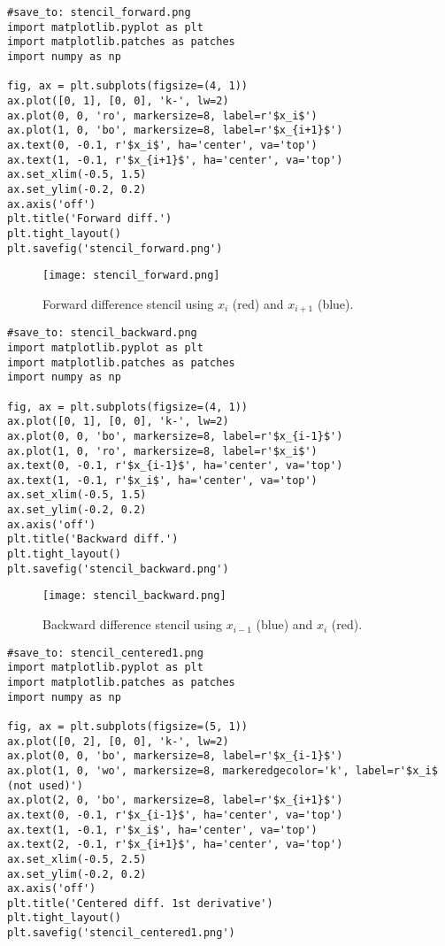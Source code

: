 \documentclass{article}
\begin{document}
\begin{verbatim}
#save_to: stencil_forward.png
import matplotlib.pyplot as plt
import matplotlib.patches as patches
import numpy as np

fig, ax = plt.subplots(figsize=(4, 1))
ax.plot([0, 1], [0, 0], 'k-', lw=2)
ax.plot(0, 0, 'ro', markersize=8, label=r'$x_i$')
ax.plot(1, 0, 'bo', markersize=8, label=r'$x_{i+1}$')
ax.text(0, -0.1, r'$x_i$', ha='center', va='top')
ax.text(1, -0.1, r'$x_{i+1}$', ha='center', va='top')
ax.set_xlim(-0.5, 1.5)
ax.set_ylim(-0.2, 0.2)
ax.axis('off')
plt.title('Forward diff.')
plt.tight_layout()
plt.savefig('stencil_forward.png')
\end{verbatim}

\begin{figure}[H]
\centering
\texttt{[image: stencil\_forward.png]}
\caption{Forward difference stencil using $x_i$ (red) and $x_{i+1}$ (blue).}
\label{fig:stencil_forward}
\end{figure}

\begin{verbatim}
#save_to: stencil_backward.png
import matplotlib.pyplot as plt
import matplotlib.patches as patches
import numpy as np

fig, ax = plt.subplots(figsize=(4, 1))
ax.plot([0, 1], [0, 0], 'k-', lw=2)
ax.plot(0, 0, 'bo', markersize=8, label=r'$x_{i-1}$')
ax.plot(1, 0, 'ro', markersize=8, label=r'$x_i$')
ax.text(0, -0.1, r'$x_{i-1}$', ha='center', va='top')
ax.text(1, -0.1, r'$x_i$', ha='center', va='top')
ax.set_xlim(-0.5, 1.5)
ax.set_ylim(-0.2, 0.2)
ax.axis('off')
plt.title('Backward diff.')
plt.tight_layout()
plt.savefig('stencil_backward.png')
\end{verbatim}

\begin{figure}[H]
\centering
\texttt{[image: stencil\_backward.png]}
\caption{Backward difference stencil using $x_{i-1}$ (blue) and $x_i$ (red).}
\label{fig:stencil_backward}
\end{figure}

\begin{verbatim}
#save_to: stencil_centered1.png
import matplotlib.pyplot as plt
import matplotlib.patches as patches
import numpy as np

fig, ax = plt.subplots(figsize=(5, 1))
ax.plot([0, 2], [0, 0], 'k-', lw=2)
ax.plot(0, 0, 'bo', markersize=8, label=r'$x_{i-1}$')
ax.plot(1, 0, 'wo', markersize=8, markeredgecolor='k', label=r'$x_i$ (not used)')
ax.plot(2, 0, 'bo', markersize=8, label=r'$x_{i+1}$')
ax.text(0, -0.1, r'$x_{i-1}$', ha='center', va='top')
ax.text(1, -0.1, r'$x_i$', ha='center', va='top')
ax.text(2, -0.1, r'$x_{i+1}$', ha='center', va='top')
ax.set_xlim(-0.5, 2.5)
ax.set_ylim(-0.2, 0.2)
ax.axis('off')
plt.title('Centered diff. 1st derivative')
plt.tight_layout()
plt.savefig('stencil_centered1.png')
\end{verbatim}
\end{document}
